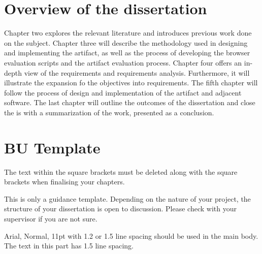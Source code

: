 \section{Overview of the dissertation}

Chapter two explores the relevant literature and introduces previous work done on the subject. Chapter three will describe the methodology used in designing and implementing the artifact, as well as the process of developing the browser evaluation scripts and the artifact evaluation process. Chapter four offers an in-depth view of the requirements and requirements analysis. Furthermore, it will illustrate the expansion fo the objectives into requirements. The fifth chapter will follow the process of design and implementation of the artifact and adjacent software. The last chapter will outline the outcomes of the dissertation and close the is with a summarization of the work, presented as a conclusion.





\iffalse
	\section{BU Template}
	The text within the square brackets must be deleted along with the square brackets when finalising your chapters.

	This is only a guidance template. Depending on the nature of your project, the structure of your dissertation is open to discussion. Please check with your supervisor if you are not sure.

	Arial, Normal, 11pt with 1.2 or 1.5 line spacing should be used in the main body. The text in this part has 1.5 line spacing.

